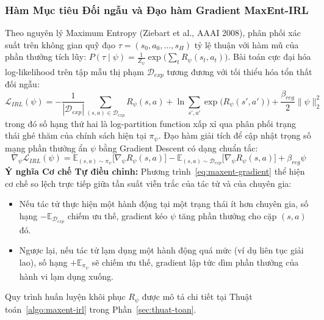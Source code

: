 \subsubsection{Hàm Mục tiêu Đối ngẫu và Đạo hàm Gradient MaxEnt-IRL}\label{subsubsec:irl-gradient}
Theo nguyên lý Maximum Entropy (Ziebart et al., AAAI 2008), phân phối xác suất trên không gian quỹ đạo $\tau = (s_0, a_0, \dots, s_H)$ tỷ lệ thuận với hàm mũ của phần thưởng tích lũy: $P(\tau \mid \psi) = \frac{1}{Z_\psi} \exp\big(\sum_{t} R_\psi(s_t, a_t)\big)$. Bài toán cực đại hóa log-likelihood trên tập mẫu thị phạm $\mathcal{D}_{exp}$ tương đương với tối thiểu hóa tổn thất đối ngẫu:
\begin{equation}\label{eq:maxent-loss}
  \mathcal{L}_{IRL}(\psi) = -\frac{1}{|\mathcal{D}_{exp}|} \sum_{(s, a) \in \mathcal{D}_{exp}} R_\psi(s, a) + \ln \sum_{s', a'} \exp\big(R_\psi(s', a')\big) + \frac{\beta_{reg}}{2} \|\psi\|_2^2
\end{equation}
trong đó số hạng thứ hai là log-partition function xấp xỉ qua phân phối trạng thái ghé thăm của chính sách hiện tại $\pi_\psi$. Đạo hàm giải tích để cập nhật trọng số mạng phần thưởng ẩn $\psi$ bằng Gradient Descent có dạng chuẩn tắc:
\begin{equation}\label{eq:maxent-gradient}
  \nabla_\psi \mathcal{L}_{IRL}(\psi) = \mathbb{E}_{(s, a) \sim \pi_\psi} \big[\nabla_\psi R_\psi(s, a)\big] - \mathbb{E}_{(s, a) \sim \mathcal{D}_{exp}} \big[\nabla_\psi R_\psi(s, a)\big] + \beta_{reg} \psi
\end{equation}
\noindent\textbf{Ý nghĩa Cơ chế Tự điều chỉnh:} Phương trình~\eqref{eq:maxent-gradient} thể hiện cơ chế so lệch trực tiếp giữa tần suất viễn trắc của tác tử và của chuyên gia:
\begin{itemize}
  \item Nếu tác tử thực hiện một hành động tại một trạng thái ít hơn chuyên gia, số hạng $-\mathbb{E}_{\mathcal{D}_{exp}}$ chiếm ưu thế, gradient kéo $\psi$ tăng phần thưởng cho cặp $(s, a)$ đó.
  \item Ngược lại, nếu tác tử lạm dụng một hành động quá mức (ví dụ liên tục giải lao), số hạng $+\mathbb{E}_{\pi_\psi}$ sẽ chiếm ưu thế, gradient lập tức dìm phần thưởng của hành vi lạm dụng xuống.
\end{itemize}
Quy trình huấn luyện khôi phục $R_\psi$ được mô tả chi tiết tại Thuật toán~\ref{algo:maxent-irl} trong Phần~\ref{sec:thuat-toan}.

\newpage

